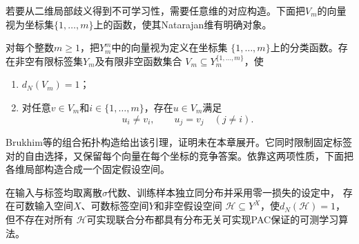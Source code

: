 若要从二维局部歧义得到不可学习性，需要任意维的对应构造。下面把$V_m$的向量视为坐标集$\{1,\ldots,m\}$上的函数，使其Natarajan维有明确对象。

\begin{lemma}[低Natarajan维的局部邻接构造]
\label{lem:low-natarajan-pseudocubes}
对每个整数$m\geq1$，把$Y_m^m$中的向量视为定义在坐标集
$\{1,\ldots,m\}$上的分类函数。存在非空有限标签集$Y_m$及有限非空函数集合
$V_m\subseteq Y_m^{\{1,\ldots,m\}}$，使
\begin{enumerate}
 \item $d_N(V_m)=1$；
 \item 对任意$v\in V_m$和$i\in\{1,\ldots,m\}$，存在$u\in V_m$满足
 \[
 u_i\neq v_i,\qquad u_j=v_j\quad(j\neq i).
 \]
\end{enumerate}
\end{lemma}

Brukhim等的组合拓扑构造给出该引理，证明未在本章展开。它同时限制固定标签对的自由选择，又保留每个向量在每个坐标的竞争答案。依靠这两项性质，下面把各维局部构造合成一个固定假设空间。

\begin{theorem}[无限标签下有限Natarajan维并不充分]
\label{thm:natarajan-infinite-counterexample}
在输入与标签均取离散$\sigma$代数、训练样本独立同分布并采用零一损失的设定中，
存在可数输入空间$X$、可数标签空间$Y$和非空假设空间
$\mathcal H\subseteq Y^X$，使$d_N(\mathcal H)=1$，但不存在对所有
$\mathcal H$可实现联合分布都具有分布无关可实现PAC保证的可测学习算法。
\end{theorem}

